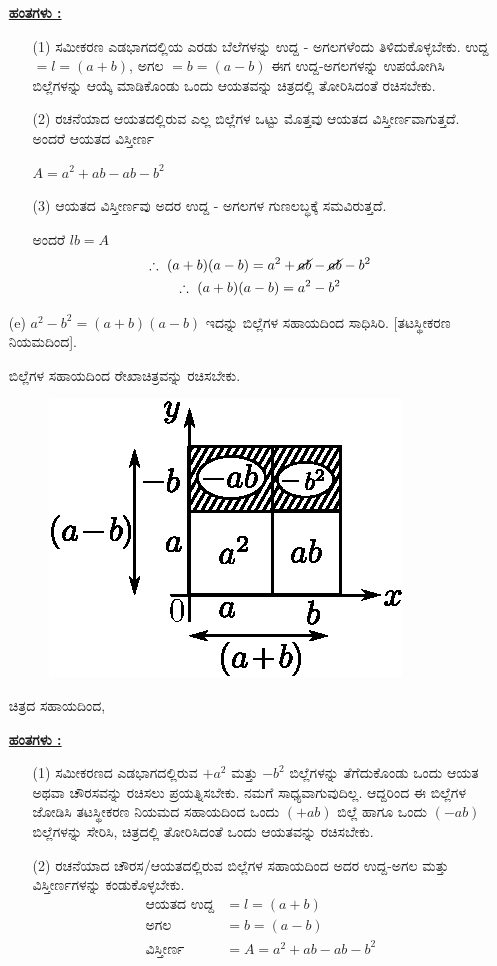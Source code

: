 \begin{enumerate}
\noindent
{\textbf{\underline{ಹಂತಗಳು :}}}
\begin{itemize}
\item[(1)] ಸಮೀಕರಣ ಎಡಭಾಗದಲ್ಲಿಯ ಎರಡು ಬೆಲೆಗಳನ್ನು ಉದ್ದ - ಅಗಲಗಳೆಂದು ತಿಳಿದುಕೊಳ್ಳಬೇಕು. ಉದ್ದ $= l = (a+b)$, ಅಗಲ $= b = (a-b)$ ಈಗ ಉದ್ದ-ಅಗಲಗಳನ್ನು ಉಪಯೋಗಿಸಿ ಬಿಲ್ಲೆಗಳನ್ನು ಆಯ್ಕೆ ಮಾಡಿಕೊಂಡು ಒಂದು ಆಯತವನ್ನು ಚಿತ್ರದಲ್ಲಿ ತೋರಿಸಿದಂತೆ ರಚಿಸಬೇಕು. 
\item[(2)] ರಚನೆಯಾದ ಆಯತದಲ್ಲಿರುವ ಎಲ್ಲ ಬಿಲ್ಲೆಗಳ ಒಟ್ಟು ಮೊತ್ತವು ಆಯತದ ವಿಸ್ತೀರ್ಣ\-ವಾಗುತ್ತದೆ. ಅಂದರೆ ಆಯತದ ವಿಸ್ತೀರ್ಣ 

$A = a^2 + ab - ab - b^2$
\item[(3)] ಆಯತದ ವಿಸ್ತೀರ್ಣವು ಅದರ ಉದ್ದ - ಅಗಲಗಳ ಗುಣಲಬ್ಧಕ್ಕೆ ಸಮವಿರುತ್ತದೆ. 

ಅಂದರೆ $lb = A$
\begin{gather*}
\therefore~ (a+b)(a-b) = a^2 + \cancel{ab} - \cancel{ab} - b^2\\
\therefore~ (a+b)(a-b) = a^2 - b^2
\end{gather*}

\end{itemize}

\item[(e)] $a^2 - b^2 = (a+b)(a-b)$ ಇದನ್ನು ಬಿಲ್ಲೆಗಳ ಸಹಾಯದಿಂದ ಸಾಧಿಸಿರಿ. [ತಟಸ್ಥೀಕರಣ ನಿಯಮದಿಂದ].

ಬಿಲ್ಲೆಗಳ ಸಹಾಯದಿಂದ ರೇಖಾಚಿತ್ರವನ್ನು ರಚಿಸಬೇಕು.
\begin{figure}[H]
\centering
\includegraphics[scale=0.8]{src/figure/chap3/fig3-32e.eps}
\end{figure}
ಚಿತ್ರದ ಸಹಾಯದಿಂದ,

\noindent
{\textbf{\underline{ಹಂತಗಳು :}}}
\begin{itemize}
\item[(1)] ಸಮೀಕರಣದ ಎಡಭಾಗದಲ್ಲಿರುವ $+a^2$ ಮತ್ತು $-b^2$ ಬಿಲ್ಲೆಗಳನ್ನು ತೆಗೆದುಕೊಂಡು ಒಂದು ಆಯತ ಅಥವಾ ಚೌರಸವನ್ನು ರಚಿಸಲು ಪ್ರಯತ್ನಿಸಬೇಕು. ನಮಗೆ ಸಾಧ್ಯವಾಗುವುದಿಲ್ಲ. ಆದ್ದರಿಂದ ಈ ಬಿಲ್ಲೆಗಳ ಜೋಡಿಸಿ ತಟಸ್ಥೀಕರಣ ನಿಯಮದ ಸಹಾಯದಿಂದ ಒಂದು $(+ab)$ ಬಿಲ್ಲೆ ಹಾಗೂ ಒಂದು $(-ab)$ ಬಿಲ್ಲೆಗಳನ್ನು ಸೇರಿಸಿ, ಚಿತ್ರದಲ್ಲಿ ತೋರಿಸಿದಂತೆ ಒಂದು ಆಯತವನ್ನು ರಚಿಸಬೇಕು. 
\item[(2)] ರಚನೆಯಾದ ಚೌರಸ/ಆಯತದಲ್ಲಿರುವ ಬಿಲ್ಲೆಗಳ ಸಹಾಯದಿಂದ ಅದರ ಉದ್ದ-ಅಗಲ ಮತ್ತು ವಿಸ್ತೀರ್ಣಗಳನ್ನು ಕಂಡುಕೊಳ್ಳಬೇಕು.
\begin{align*}
\text{ಆಯತದ ಉದ್ದ}& = l = (a+b)\\
\text{ಅಗಲ} & = b = (a-b)\\
\text{ವಿಸ್ತೀರ್ಣ} & = A = a^2 + ab - ab - b^2
\end{align*}


\end{itemize}
\end{enumerate}
